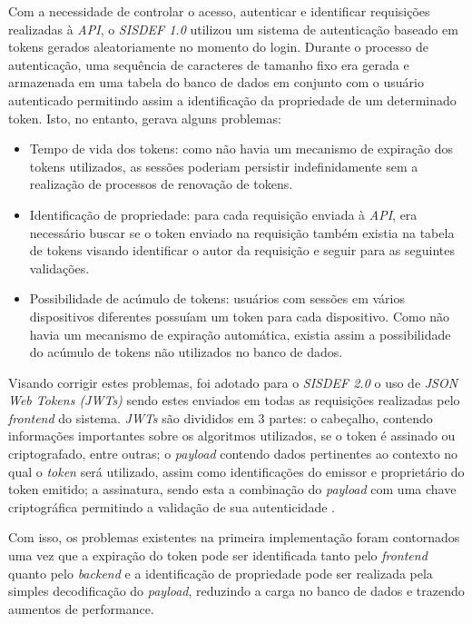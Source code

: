 \documentclass[nonacm, sigconf]{acmart}
\begin{document}
Com a necessidade de controlar o acesso, autenticar e identificar requisições realizadas à \textit{API}, o \textit{SISDEF 1.0} utilizou um sistema de autenticação baseado em tokens gerados aleatoriamente no momento do login. Durante o processo de autenticação, uma sequência de caracteres de tamanho fixo era gerada e armazenada em uma tabela do banco de dados em conjunto com o usuário autenticado permitindo assim a identificação da propriedade de um determinado token. Isto, no entanto, gerava alguns problemas:
\begin{itemize}
    \item Tempo de vida dos tokens: como não havia um mecanismo de expiração dos tokens utilizados, as sessões poderiam persistir indefinidamente sem a realização de processos de renovação de tokens.
    \item Identificação de propriedade: para cada requisição enviada à \textit{API}, era necessário buscar se o token enviado na requisição também existia na tabela de tokens visando identificar o autor da requisição e seguir para as seguintes validações.
    \item Possibilidade de acúmulo de tokens: usuários com sessões em vários dispositivos diferentes possuíam um token para cada dispositivo. Como não havia um mecanismo de expiração automática, existia assim a possibilidade do acúmulo de tokens não utilizados no banco de dados.
\end{itemize}
Visando corrigir estes problemas, foi adotado para o \textit{SISDEF 2.0} o uso de \textit{JSON Web Tokens (JWTs)} sendo estes enviados em todas as requisições realizadas pelo \textit{frontend} do sistema. \textit{JWTs} são divididos em 3 partes: o cabeçalho, contendo informações importantes sobre os algoritmos utilizados, se o token é assinado ou criptografado, entre outras; o \textit{payload} contendo dados pertinentes ao contexto no qual o \textit{token} será utilizado, assim como identificações do emissor e proprietário do token emitido; a assinatura, sendo esta a combinação do \textit{payload} com uma chave criptográfica permitindo a validação de sua autenticidade \cite{peyrott2016jwt}.

Com isso, os problemas existentes na primeira implementação foram contornados uma vez que a expiração do token pode ser identificada tanto pelo \textit{frontend} quanto pelo \textit{backend} e a identificação de propriedade pode ser realizada pela simples decodificação do \textit{payload}, reduzindo a carga no banco de dados e trazendo aumentos de performance.
\end{document}
